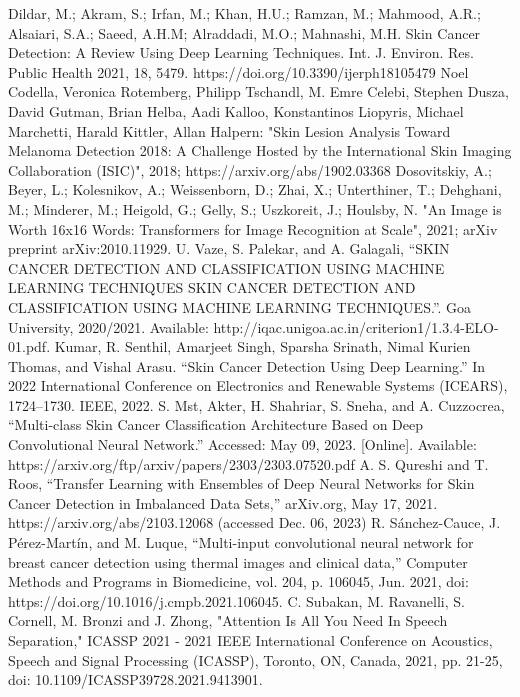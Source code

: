 \documentclass[conference]{IEEEtran}
\begin{document}
\begin{thebibliography}{00}
 Dildar, M.; Akram, S.; Irfan, M.; Khan, H.U.; Ramzan, M.; Mahmood, A.R.; Alsaiari, S.A.; Saeed, A.H.M; Alraddadi, M.O.; Mahnashi, M.H. Skin Cancer Detection: A Review Using Deep Learning Techniques. Int. J. Environ. Res. Public Health 2021, 18, 5479. https://doi.org/10.3390/ijerph18105479
 Noel Codella, Veronica Rotemberg, Philipp Tschandl, M. Emre Celebi, Stephen Dusza, David Gutman, Brian Helba, Aadi Kalloo, Konstantinos Liopyris, Michael Marchetti, Harald Kittler, Allan Halpern: "Skin Lesion Analysis Toward Melanoma Detection 2018: A Challenge Hosted by the International Skin Imaging Collaboration (ISIC)", 2018; https://arxiv.org/abs/1902.03368
 Dosovitskiy, A.; Beyer, L.; Kolesnikov, A.; Weissenborn, D.; Zhai, X.; Unterthiner, T.; Dehghani, M.; Minderer, M.; Heigold, G.; Gelly, S.; Uszkoreit, J.; Houlsby, N. "An Image is Worth 16x16 Words: Transformers for Image Recognition at Scale", 2021; arXiv preprint arXiv:2010.11929.
 U. Vaze, S. Palekar, and A. Galagali, “SKIN CANCER DETECTION AND CLASSIFICATION USING MACHINE LEARNING TECHNIQUES SKIN CANCER DETECTION AND CLASSIFICATION USING MACHINE LEARNING TECHNIQUES.”. Goa University, 2020/2021. Available: http://iqac.unigoa.ac.in/criterion1/1.3.4-ELO-01.pdf.
 Kumar, R. Senthil, Amarjeet Singh, Sparsha Srinath, Nimal Kurien Thomas, and Vishal Arasu. “Skin Cancer Detection Using Deep Learning.” In 2022 International Conference on Electronics and Renewable Systems (ICEARS), 1724–1730. IEEE, 2022.
 S. Mst, Akter, H. Shahriar, S. Sneha, and A. Cuzzocrea, “Multi-class Skin Cancer Classification Architecture Based on Deep Convolutional Neural Network.” Accessed: May 09, 2023. [Online]. Available: https://arxiv.org/ftp/arxiv/papers/2303/2303.07520.pdf
 A. S. Qureshi and T. Roos, “Transfer Learning with Ensembles of Deep Neural Networks for Skin Cancer Detection in Imbalanced Data Sets,” arXiv.org, May 17, 2021. https://arxiv.org/abs/2103.12068 (accessed Dec. 06, 2023)
 R. Sánchez-Cauce, J. Pérez-Martín, and M. Luque, “Multi-input convolutional neural network for breast cancer detection using thermal images and clinical data,” Computer Methods and Programs in Biomedicine, vol. 204, p. 106045, Jun. 2021, doi: https://doi.org/10.1016/j.cmpb.2021.106045.
 C. Subakan, M. Ravanelli, S. Cornell, M. Bronzi and J. Zhong, "Attention Is All You Need In Speech Separation," ICASSP 2021 - 2021 IEEE International Conference on Acoustics, Speech and Signal Processing (ICASSP), Toronto, ON, Canada, 2021, pp. 21-25, doi: 10.1109/ICASSP39728.2021.9413901.

\end{thebibliography}
\end{document}
